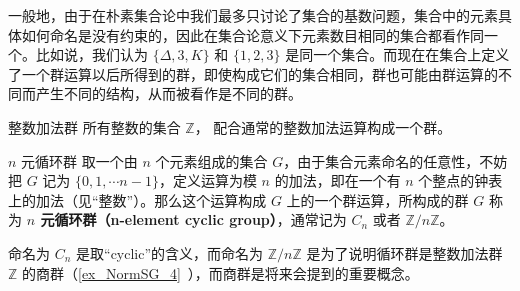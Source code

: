 一般地，由于在朴素集合论中我们最多只讨论了集合的基数问题，集合中的元素具体如何命名是没有约束的，因此在集合论意义下元素数目相同的集合都看作同一个。比如说，我们认为 $\{\Delta,3, K\}$ 和 $\{1,2,3\}
$ 是同一个集合。而现在在集合上定义了一个群运算以后所得到的群，即使构成它们的集合相同，群也可能由群运算的不同而产生不同的结构，从而被看作是不同的群。

\begin{example}{整数加法群}\label{ex_Group_1}
所有整数的集合 $\mathbb Z$， 配合通常的整数加法运算构成一个群。
\end{example}

\begin{example}{$n$ 元循环群}\label{ex_Group_2}
取一个由 $n$ 个元素组成的集合 $G$，由于集合元素命名的任意性，不妨把 $G$ 记为 $\{0, 1, \cdots n-1\}$，定义运算为模 $n$ 的加法，即在一个有 $n$ 个整点的钟表上的加法（见“整数”）。那么这个运算构成 $G$ 上的一个群运算，所构成的群 $G$ 称为 \textbf{$n$ 元\textbf{循环群（n-element cyclic group）}}，通常记为 $C_n$ 或者 $\mathbb{Z}/n\mathbb{Z}$。

命名为 $C_n$ 是取“cyclic”的含义，而命名为 $\mathbb{Z}/n\mathbb{Z}$ 是为了说明循环群是整数加法群 $\mathbb{Z}$ 的商群（\autoref{ex_NormSG_4}~），而商群是将来会提到的重要概念。
\end{example}

